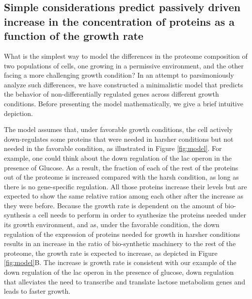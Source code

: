 \subsection{Simple considerations predict passively driven increase in the concentration of proteins as a function of the growth rate}
What is the simplest way to model the differences in the proteome composition of two populations of cells, one growing in a permissive environment, and the other facing a more challenging growth condition?
In an attempt to parsimoniously analyze such differences, we have constructed a minimalistic model that predicts the behavior of non-differentially regulated genes across different growth conditions.
Before presenting the model mathematically, we give a brief intuitive depiction.

The model assumes that, under favorable growth conditions, the cell actively down-regulates some proteins that were needed in harsher conditions but not needed in the favorable condition, as illustrated in Figure \ref{fig:model}.
For example, one could think about the down regulation of the lac operon in the presence of Glucose. 
As a result, the fraction of each of the rest of the proteins out of the proteome is increased compared with the harsh condition, as long as there is no gene-specific regulation.
All those proteins increase their levels but are expected to show the same relative ratios among each other after the increase as they were before. 
Because the growth rate is dependent on the amount of bio-synthesis a cell needs to perform in order to synthesize the proteins needed under its growth environment, and as, under the favorable condition, the down regulation of the expression of proteins needed for growth in harsher conditions results in an increase in the ratio of bio-synthetic machinery to the rest of the proteome, the growth rate is expected to increase, as  depicted in Figure \ref{fig:model}B.
The increase is growth rate is consistent with our example of the down regulation of the lac operon in the presence of glucose, down regulation that alleviates the need to transcribe and translate lactose metabolism genes and leads to faster growth.